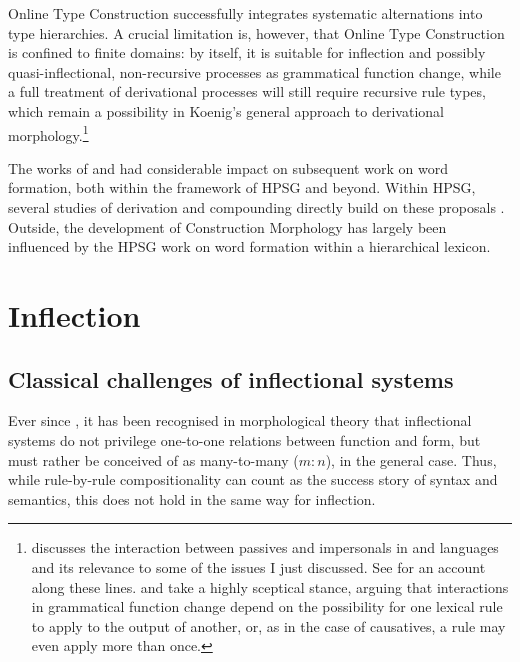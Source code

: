 \documentclass[output=paper,biblatex,babelshorthands,newtxmath,draftmode,colorlinks,citecolor=brown]{langscibook}
\begin{document}
Online Type Construction successfully integrates systematic
alternations into type hierarchies. A crucial limitation is, however,
that Online Type Construction is confined to finite domains: by itself, it is suitable for
inflection and possibly quasi-inflectional, non-recursive processes as
grammatical function change, while a full treatment of derivational
processes will still require recursive rule types, which remain a
possibility in Koenig's general approach to derivational
morphology.\footnote{\citet{Blevins2003a} discusses the interaction
  between passives and impersonals in  and  languages and
  its relevance to some of the issues I just discussed. See
  \citet{ASU99a-u} for an account along these lines.   and  take a
  highly sceptical stance, arguing that interactions in grammatical
  function change depend on the possibility for one lexical rule to
  apply to the output of another, or, as in the case of 
  causatives, a rule may even apply more than
  once.}

The works of \citet{Riehemann98} and \cite{Koenig99} had considerable
impact on subsequent work on word formation, both within the framework 
of HPSG and beyond. Within HPSG, several studies of  derivation
and compounding directly build on these proposals \citep[e.g.][]{Tribout10,Desmets09}. 
Outside, the development of Construction Morphology
\citep{Booij10} has largely been influenced by the HPSG work on word
formation within a hierarchical lexicon. 

\section{Inflection}
\label{sec:Infl}\label{sec:inflection}

\subsection{Classical challenges of inflectional systems}
\label{sec:InflChallenges}

Ever since \citet{Matthews72}, it has been recognised in morphological
theory that inflectional systems do not privilege one-to-one relations
between function and form, but must rather be conceived of as
many-to-many ($m:n$), in the general case. Thus, while
rule-by-rule compositionality can count as the success story
of syntax and semantics, this does not hold in the same way for inflection. 
\end{document}
